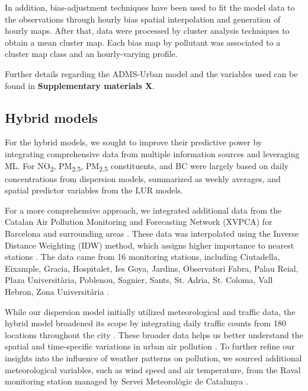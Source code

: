\documentclass{article}
\begin{document}
In addition, bias-adjustment techniques have been used to fit the model data to the observations through hourly bias spatial interpolation and generation of hourly maps. After that, data were processed  by cluster analysis techniques to obtain a mean cluster map. Each bias map by pollutant was associated to a cluster map class and an hourly-varying profile. 

Further details regarding the ADMS-Urban model and the variables used can be found in \textbf{Supplementary materials X}.

\subsection{Hybrid models}

For the hybrid models, we sought to improve their predictive power by integrating comprehensive data from multiple information sources and leveraging ML. For NO\textsubscript{2}, PM\textsubscript{2.5}, PM\textsubscript{2.5} constituents, and BC were largely based on daily concentrations from dispersion models, summarized as weekly averages, and spatial predictor variables from the LUR models. 

For a more comprehensive approach, we integrated additional data from the Catalan Air Pollution Monitoring and Forecasting Network (XVPCA) for Barcelona and surrounding areas \cite{xarxa2012}. These data was interpolated using the Inverse Distance Weighting (IDW) method, which assigns higher importance to nearest stations \cite{hoek2017methods}. The data came from 16 monitoring stations, including Ciutadella, Eixample, Gracia, Hospitalet, Ies Goya, Jardins, Observatori Fabra, Palau Reial, Plaza Universitària, Poblenou, Sagnier, Sants, St. Adria, St. Coloma, Vall Hebron, Zona Universitária \cite{xarxa2012}.

While our dispersion model initially utilized meteorological and traffic data, the hybrid model broadened its scope by integrating daily traffic counts from 180 locations throughout the city \cite{trafficbcn}. These broader data helps us better understand the spatial and time-specific variations in urban air pollution \cite{pinto2020}. To further refine our insights into the influence of weather patterns on pollution, we sourced additional meteorological variables, such as wind speed and air temperature, from the Raval monitoring station managed by Servei Meteorològic de Catalunya \cite{xema2013}.
\end{document}
